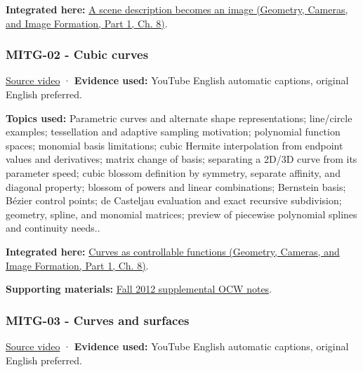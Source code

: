 \textbf{Integrated here:} \href{../03-Geometry-Cameras-and-Image-Formation-P01/main.pdf\#03-visual-computing-i-ch001-a-scene-description-becomes-an-image}{A scene description becomes an image (Geometry, Cameras, and Image Formation, Part 1, Ch. 8)}.

\subsubsection{MITG-02 - Cubic curves}\label{04-visual-computing-ii-ch036-mitg-02---cubic-curves}

\hypertarget{04-visual-computing-ii-ch036-mitg-02---cubic-curves}{}

\href{https://www.youtube.com/watch?v=1BZ0ayVjWEk}{Source video} · \textbf{Evidence used:} YouTube English automatic captions, original English preferred.

\textbf{Topics used:} Parametric curves and alternate shape representations; line/circle examples; tessellation and adaptive sampling motivation; polynomial function spaces; monomial basis limitations; cubic Hermite interpolation from endpoint values and derivatives; matrix change of basis; separating a 2D/3D curve from its parameter speed; cubic blossom definition by symmetry, separate affinity, and diagonal property; blossom of powers and linear combinations; Bernstein basis; Bézier control points; de Casteljau evaluation and exact recursive subdivision; geometry, spline, and monomial matrices; preview of piecewise polynomial splines and continuity needs..

\textbf{Integrated here:} \href{../03-Geometry-Cameras-and-Image-Formation-P01/main.pdf\#03-visual-computing-i-ch001-curves-as-controllable-functions}{Curves as controllable functions (Geometry, Cameras, and Image Formation, Part 1, Ch. 8)}.

\textbf{Supporting materials:} \href{https://ocw.mit.edu/courses/6-837-computer-graphics-fall-2012/pages/lecture-notes/}{Fall 2012 supplemental OCW notes}.

\subsubsection{MITG-03 - Curves and surfaces}\label{04-visual-computing-ii-ch036-mitg-03---curves-and-surfaces}

\hypertarget{04-visual-computing-ii-ch036-mitg-03---curves-and-surfaces}{}

\href{https://www.youtube.com/watch?v=LzIjSdNoR9s}{Source video} · \textbf{Evidence used:} YouTube English automatic captions, original English preferred.

